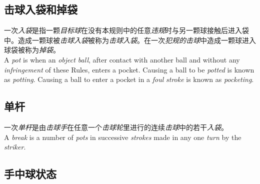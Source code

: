 \subsection{击球入袋和掉袋}

\noindent 一次\emph{入袋}是指一颗\emph{目标球}在没有本规则中的任意\emph{违规}时与另一颗球接触后进入袋中。造成一颗球被\emph{击球入袋}被称为\emph{击球入袋}。在一次\emph{犯规的}\emph{击球}中造成一颗球进入球袋被称为\emph{掉袋}。\\
A \emph{pot} is when an \emph{object ball}, after contact with another ball and without any \emph{infringement} of these Rules, enters a pocket. Causing a ball to be \emph{potted} is known as \emph{potting}. Causing a ball to enter a pocket in a \emph{foul} \emph{stroke} is known as \emph{pocketing}.

\subsection{单杆}

\noindent 一次\emph{单杆}是由\emph{击球手}在任意一个\emph{击球轮}里进行的连续\emph{击球}中的若干\emph{入袋}。\\
A \emph{break} is a number of \emph{pots} in successive \emph{strokes} made in any one \emph{turn} by the \emph{striker}.

\subsection{手中球状态}

